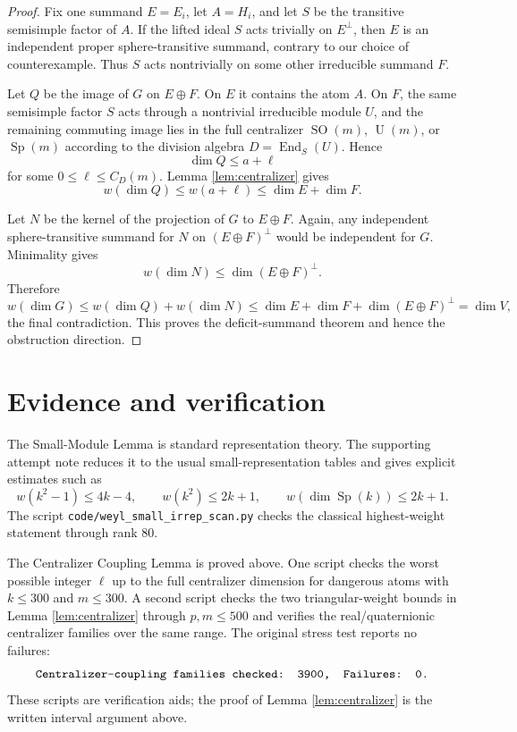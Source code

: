 \documentclass[11pt]{article}
\DeclareMathOperator{\SO}{SO}
\DeclareMathOperator{\U}{U}
\DeclareMathOperator{\Sp}{Sp}
\begin{document}
\begin{proof}
Fix one summand $E=E_i$, let $A=H_i$, and let $S$ be the transitive
semisimple factor of $A$.  If the lifted ideal $S$ acts trivially on
$E^\perp$, then $E$ is an independent proper sphere-transitive summand,
contrary to our choice of counterexample.  Thus $S$ acts nontrivially on
some other irreducible summand $F$.

Let $Q$ be the image of $G$ on $E\oplus F$.  On $E$ it contains the atom
$A$.  On $F$, the same semisimple factor $S$ acts through a nontrivial
irreducible module $U$, and the remaining commuting image lies in the full
centralizer $\SO(m)$, $\U(m)$, or $\Sp(m)$ according to the division algebra
$D=\operatorname{End}_S(U)$.  Hence
\[
\dim Q\leq a+\ell
\]
for some $0\leq \ell\leq C_D(m)$.  Lemma \ref{lem:centralizer} gives
\[
w(\dim Q)\leq w(a+\ell)\leq \dim E+\dim F.
\]

Let $N$ be the kernel of the projection of $G$ to $E\oplus F$.  Again, any
independent sphere-transitive summand for $N$ on $(E\oplus F)^\perp$ would
be independent for $G$.  Minimality gives
\[
w(\dim N)\leq \dim(E\oplus F)^\perp.
\]
Therefore
\[
w(\dim G)
\leq w(\dim Q)+w(\dim N)
\leq \dim E+\dim F+\dim(E\oplus F)^\perp
=\dim V,
\]
the final contradiction.  This proves the deficit-summand theorem and hence
the obstruction direction.
\end{proof}

\section*{Evidence and verification}

The Small-Module Lemma is standard representation theory.  The supporting
attempt note reduces it to the usual small-representation tables and gives
explicit estimates such as
\[
w(k^2-1)\leq 4k-4,\qquad
w(k^2)\leq 2k+1,\qquad
w(\dim\Sp(k))\leq 2k+1.
\]
The script \texttt{code/weyl\_small\_irrep\_scan.py} checks the classical
highest-weight statement through rank $80$.

The Centralizer Coupling Lemma is proved above.  One script checks the worst
possible integer $\ell$ up to the full centralizer dimension for dangerous
atoms with $k\leq 300$ and $m\leq 300$.  A second script checks the two
triangular-weight bounds in Lemma \ref{lem:centralizer} through
$p,m\leq 500$ and verifies the real/quaternionic centralizer families over
the same range.  The original stress test reports no failures:
\[
\texttt{Centralizer-coupling families checked: 3900,\quad Failures: 0.}
\]
These scripts are verification aids; the proof of Lemma \ref{lem:centralizer}
is the written interval argument above.
\end{document}
